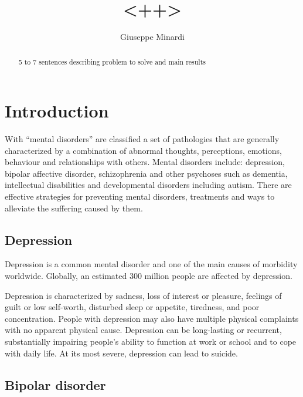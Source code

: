\documentclass[11pt, onecolumn, twoside]{article}
\title{<++>}
\author{Giuseppe Minardi}
\begin{document}
\sloppy
\maketitle

\tableofcontents

\begin{abstract}

5 to 7 sentences describing problem to solve and main results

\end{abstract}

\twocolumn

\section{Introduction}\label{introduction}

With ``mental disorders'' are classified a set of pa\-tho\-lo\-gies that are generally characterized by a com\-bi\-na\-tion of abnormal thoughts, perceptions, e\-mo\-ti\-ons, behaviour and relationships with others.
Men\-tal disorders include: depression, bipolar affective disorder, schi\-zo\-phre\-nia and other psychoses such as dementia, intellectual disabilities and developmental disorders including autism.
There are effective strategies for preventing mental disorders, treatments and ways to alleviate the suffering caused by them.

\subsection{Depression}\label{depression}

Depression is a common mental disorder and one of the main causes of morbidity worldwide. Globally, an estimated 300 million people are affected by depression.

Depression is characterized by sadness, loss of interest or pleasure, feelings of guilt or low self-worth, disturbed sleep or appetite, tiredness, and poor concentration.
People with depression may also have multiple physical complaints with no apparent physical cause.
Depression can be long-lasting or recurrent, substantially impairing people's ability to function at work or school and to cope with daily life. At its most severe, depression can lead to suicide.

\subsection{Bipolar disorder}\label{bipolar-disorder}
\end{document}
